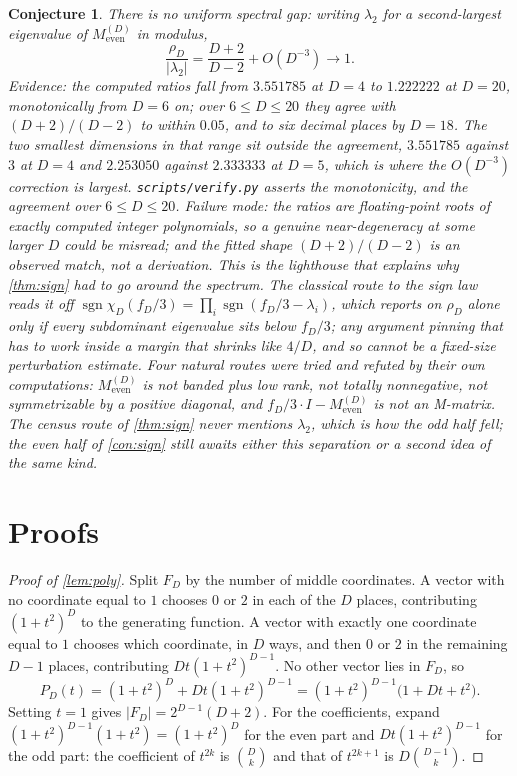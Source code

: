\documentclass[11pt]{amsart}
\newtheorem{conjecture}[theorem]{Conjecture}
\theoremstyle{definition}
\theoremstyle{remark}
\begin{document}
\begin{conjecture}
\label{con:gap}
There is no uniform spectral gap: writing $\lambda_2$ for a second-largest eigenvalue of $M_{\mathrm{even}}^{(D)}$ in modulus,
\[
\frac{\rho_D}{\lvert \lambda_2 \rvert} = \frac{D+2}{D-2} + O(D^{-3}) \longrightarrow 1 .
\]
Evidence: the computed ratios fall from $3.551785$ at $D = 4$ to $1.222222$ at $D = 20$, monotonically from $D = 6$ on; over $6 \le D \le 20$ they agree with $(D+2)/(D-2)$ to within $0.05$, and to six decimal places by $D = 18$. The two smallest dimensions in that range sit outside the agreement, $3.551785$ against $3$ at $D = 4$ and $2.253050$ against $2.333333$ at $D = 5$, which is where the $O(D^{-3})$ correction is largest. \texttt{scripts/verify.py} asserts the monotonicity, and the agreement over $6 \le D \le 20$.
Failure mode: the ratios are floating-point roots of exactly computed integer polynomials, so a genuine near-degeneracy at some larger $D$ could be misread; and the fitted shape $(D+2)/(D-2)$ is an observed match, not a derivation.
This is the lighthouse that explains why \cref{thm:sign} had to go around the spectrum. The classical route to the sign law reads it off $\operatorname{sgn} \chi_D(f_D/3) = \prod_i \operatorname{sgn}(f_D/3 - \lambda_i)$, which reports on $\rho_D$ alone only if every subdominant eigenvalue sits below $f_D/3$; any argument pinning that has to work inside a margin that shrinks like $4/D$, and so cannot be a fixed-size perturbation estimate. Four natural routes were tried and refuted by their own computations: $M_{\mathrm{even}}^{(D)}$ is not banded plus low rank, not totally nonnegative, not symmetrizable by a positive diagonal, and $f_D/3 \cdot I - M_{\mathrm{even}}^{(D)}$ is not an M-matrix. The census route of \cref{thm:sign} never mentions $\lambda_2$, which is how the odd half fell; the even half of \cref{con:sign} still awaits either this separation or a second idea of the same kind.
\end{conjecture}

\section{Proofs}
\label{sec:proofs}

\begin{proof}[Proof of \cref{lem:poly}]
Split $F_D$ by the number of middle coordinates. A vector with no coordinate equal to $1$ chooses $0$ or $2$ in each of the $D$ places, contributing $(1+t^2)^D$ to the generating function. A vector with exactly one coordinate equal to $1$ chooses which coordinate, in $D$ ways, and then $0$ or $2$ in the remaining $D-1$ places, contributing $Dt(1+t^2)^{D-1}$. No other vector lies in $F_D$, so
\[
P_D(t) = (1+t^2)^D + Dt(1+t^2)^{D-1} = (1+t^2)^{D-1}\bigl(1+Dt+t^2\bigr).
\]
Setting $t = 1$ gives $\lvert F_D \rvert = 2^{D-1}(D+2)$. For the coefficients, expand $(1+t^2)^{D-1}(1+t^2) = (1+t^2)^D$ for the even part and $Dt(1+t^2)^{D-1}$ for the odd part: the coefficient of $t^{2k}$ is $\binom{D}{k}$ and that of $t^{2k+1}$ is $D\binom{D-1}{k}$.
\end{proof}
\end{document}
